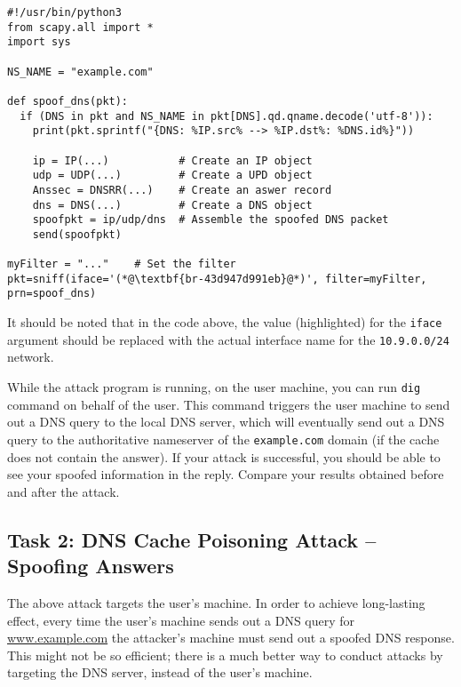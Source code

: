 \begin{lstlisting}
#!/usr/bin/python3
from scapy.all import *
import sys

NS_NAME = "example.com"

def spoof_dns(pkt):
  if (DNS in pkt and NS_NAME in pkt[DNS].qd.qname.decode('utf-8')):
    print(pkt.sprintf("{DNS: %IP.src% --> %IP.dst%: %DNS.id%}"))

    ip = IP(...)           # Create an IP object
    udp = UDP(...)         # Create a UPD object
    Anssec = DNSRR(...)    # Create an aswer record
    dns = DNS(...)         # Create a DNS object
    spoofpkt = ip/udp/dns  # Assemble the spoofed DNS packet
    send(spoofpkt)

myFilter = "..."    # Set the filter
pkt=sniff(iface='(*@\textbf{br-43d947d991eb}@*)', filter=myFilter, prn=spoof_dns)
\end{lstlisting}

It should be noted that in the code above, the value (highlighted) for the 
\texttt{iface} argument should be replaced with the actual interface 
name for the \texttt{10.9.0.0/24} network.  
 


While the attack program is running, on the user machine, you can
run \texttt{dig} command on behalf of the user.
This command triggers the user
machine to send out a DNS query to the local DNS server, which will
eventually send out a DNS query to the authoritative nameserver of the
\texttt{example.com} domain (if the cache does not contain the answer).
If your attack is successful, you should be able to see
your spoofed information in the reply. Compare your results obtained before
and after the attack. 



\subsection{Task 2: DNS Cache Poisoning Attack -- Spoofing Answers}

The above attack targets the user's machine. In order to achieve long-lasting
effect, every time the user's machine sends out a DNS query for
\url{www.example.com}
the attacker's machine must send out a spoofed DNS response. 
This might not be so efficient; there is a much better way to conduct attacks 
by targeting the DNS server, instead of the user's machine.


